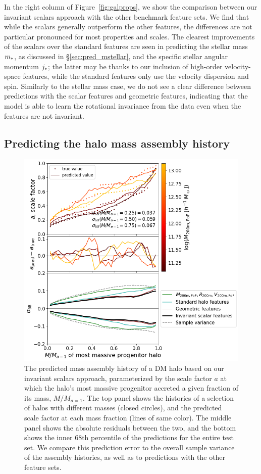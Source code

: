 In the right column of Figure~\ref{fig:galprops}, we show the comparison between our invariant scalars approach with the other benchmark feature sets.
We find that while the scalars generally outperform the other features, the differences are not particular pronounced for most properties and scales.
The clearest improvements of the scalars over the standard features are seen in predicting the stellar mass $m_*$, as discussed in \S\ref{sec:pred_mstellar}, and the specific stellar angular momentum $j_*$; the latter may be thanks to our inclusion of high-order velocity-space features, while the standard features only use the velocity dispersion and spin.
Similarly to the stellar mass case, we do not see a clear difference between predictions with the scalar features and geometric features, indicating that the model is able to learn the rotational invariance from the data even when the features are not invariant.


\subsection{Predicting the halo mass assembly history}


\begin{figure}
    \includegraphics[width=0.77\columnwidth,right]{pred_amfracs.png}
    \caption{The predicted mass assembly history of a DM halo based on our invariant scalars approach, parameterized by the scale factor $a$ at which the halo's most massive progenitor accreted a given fraction of its mass, $M/M_{a=1}$. The top panel shows the histories of a selection of halos with different masses (closed circles), and the predicted scale factor at each mass fraction (lines of same color). The middle panel shows the absolute residuals between the two, and the bottom shows the inner 68th percentile of the predictions for the entire test set. We compare this prediction error to the overall sample variance of the assembly histories, as well as to predictions with the other feature sets.}
    \label{fig:mah}
\end{figure}


